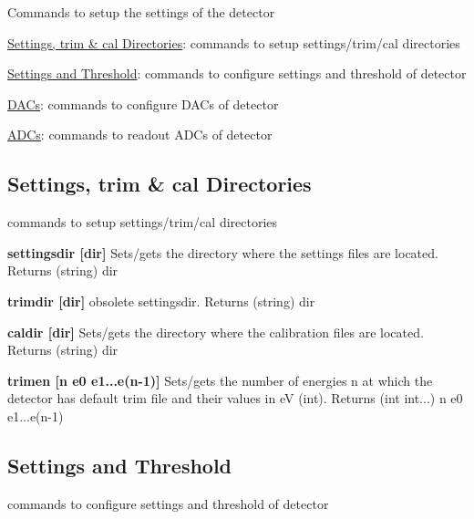 Commands to setup the settings of the detector
\begin{DoxyItemize}
\item \hyperlink{settings_settingsdir}{Settings, trim \& cal Directories}: commands to setup settings/trim/cal directories
\item \hyperlink{settings_settingssett}{Settings and Threshold}: commands to configure settings and threshold of detector
\item \hyperlink{settings_settingsdacs}{DACs}: commands to configure DACs of detector
\item \hyperlink{settings_settingsadcs}{ADCs}: commands to readout ADCs of detector
\end{DoxyItemize}\hypertarget{settings_settingsdir}{}\subsection{Settings, trim \& cal Directories}\label{settings_settingsdir}
commands to setup settings/trim/cal directories


\begin{DoxyItemize}
\item {\bfseries settingsdir \mbox{[}dir\mbox{]}} Sets/gets the directory where the settings files are located. {\ttfamily Returns} {\ttfamily }(string) dir
\end{DoxyItemize}


\begin{DoxyItemize}
\item {\bfseries trimdir \mbox{[}dir\mbox{]}} obsolete {\ttfamily settingsdir}. {\ttfamily Returns} {\ttfamily }(string) dir
\end{DoxyItemize}


\begin{DoxyItemize}
\item {\bfseries caldir \mbox{[}dir\mbox{]}} Sets/gets the directory where the calibration files are located. {\ttfamily Returns} {\ttfamily }(string) dir
\end{DoxyItemize}


\begin{DoxyItemize}
\item {\bfseries trimen \mbox{[}n e0 e1...e(n-\/1)\mbox{]}} Sets/gets the number of energies n at which the detector has default trim file and their values in eV (int). {\ttfamily Returns} {\ttfamily }(int int...) n e0 e1...e(n-\/1)
\end{DoxyItemize}\hypertarget{settings_settingssett}{}\subsection{Settings and Threshold}\label{settings_settingssett}
commands to configure settings and threshold of detector


